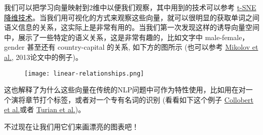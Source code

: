 我们可以把学习向量映射到2维中以便我们观察，其中用到的技术可以参考 \href{http://lvdmaaten.github.io/tsne/}{t-SNE 降维技术}。当我们用可视化的方式来观察这些向量，就可以很明显的获取单词之间语义信息的关系，这实际上是非常有用的。当我们第一次发现这样的诱导向量空间中，展示了一些特定的语义关系，这是非常有趣的，比如文字中 male-female，gender 甚至还有 country-capital 的关系, 如下方的图所示 (也可以参考 \href{http://www.aclweb.org/anthology/N13-1090}{Mikolov et al.}, 2013论文中的例子)。
\begin{center}
\begin{figure}[H]
\texttt{[image: linear-relationships.png]}
\end{figure}
\end{center}
这也解释了为什么这些向量在传统的NLP问题中可作为特性使用，比如用在对一个演将章节打个标签，或者对一个专有名词的识别 (看看如下这个例子 \href{https://arxiv.org/pdf/1103.0398v1.pdf}{Collobert et al.}或者 \href{http://www.aclweb.org/anthology/P10-1040}{Turian et al.})。

不过现在让我们用它们来画漂亮的图表吧！

